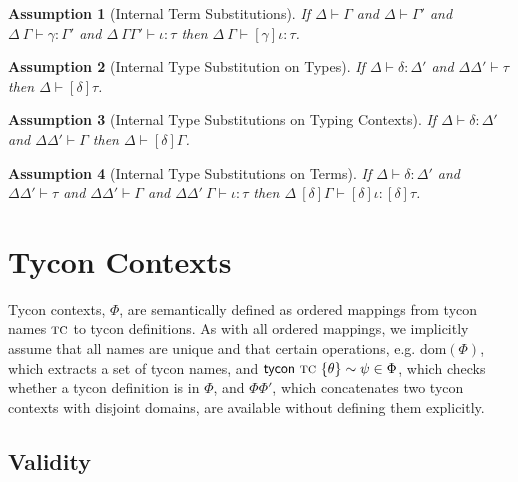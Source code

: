 \documentclass[12pt]{article}
\newtheorem{assumption}{Assumption}
\begin{document}
\begin{assumption}[Internal Term Substitutions] 
\label{assumption:internal-term-substituions}
If $\Delta \vdash \Gamma$ and $\Delta \vdash \Gamma'$ and $\Delta~\Gamma \vdash \gamma : \Gamma'$ and $\Delta~\Gamma\Gamma' \vdash \iota : \tau$ then $\Delta~\Gamma \vdash [\gamma]\iota : \tau$.
\end{assumption}

\begin{assumption}[Internal Type Substitution on Types]
\label{lemma:internal-type-substitution-on-types} If $\Delta \vdash \delta : \Delta'$ and $\Delta\Delta' \vdash \tau$ then $\Delta \vdash [\delta]\tau$.\end{assumption}

\begin{assumption}[Internal Type Substitutions on Typing Contexts] 
\label{lemma:internal-type-substitutions-on-typing-contexts}
If $\Delta \vdash \delta : \Delta'$ and $\Delta\Delta' \vdash \Gamma$ then $\Delta \vdash [\delta]\Gamma$.
\end{assumption}

\begin{assumption}[Internal Type Substitutions on Terms] 
\label{lemma:internal-type-substitutions-on-terms}
If $\Delta \vdash \delta : \Delta'$ and $\Delta\Delta' \vdash \tau$ and $\Delta\Delta' \vdash \Gamma$ and $\Delta\Delta'~\Gamma \vdash \iota : \tau$ then $\Delta~[\delta]\Gamma \vdash [\delta]\iota : [\delta]\tau$.
\end{assumption}



\newpage
\section{Tycon Contexts}
Tycon contexts, $\Phi$, are semantically defined as ordered mappings from tycon names $\textsc{tc}$ to tycon definitions. As with all ordered mappings, we implicitly assume that all names are unique and that certain operations, e.g. $\text{dom}(\Phi)$, which extracts a set of tycon names, and ${\sf tycon}~\textsc{tc} ~\{\theta\} \sim \psi \in \Phi$, which checks whether a tycon definition is in $\Phi$, and $\Phi\Phi'$, which concatenates two tycon contexts with disjoint domains, are available without defining them explicitly. 

\subsection{Validity}
\end{document}

